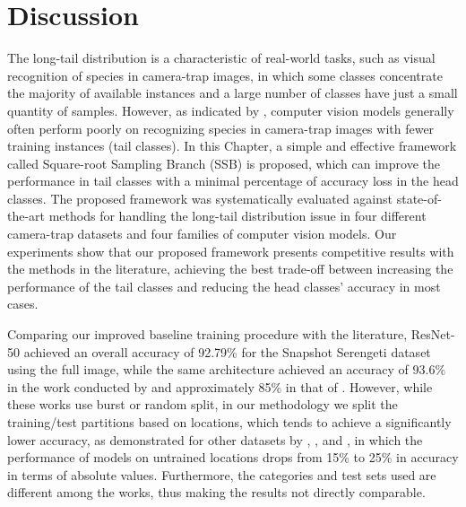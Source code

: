 \section{Discussion}

The long-tail distribution is a characteristic of real-world tasks, such as
visual recognition of species in camera-trap images, in which some classes
concentrate the majority of available instances and a large number of classes
have just a small quantity of samples. However, as indicated by
\citet{schneider2020three}, computer vision models generally often perform
poorly on recognizing species in camera-trap images with fewer training
instances (tail classes). In this Chapter, a simple and effective framework
called Square-root Sampling Branch (SSB) is proposed, which can improve the
performance in tail classes with a minimal percentage of accuracy loss in the
head classes. The proposed framework was systematically evaluated against
state-of-the-art methods for handling the long-tail distribution issue in four
different camera-trap datasets and four families of computer vision models. Our
experiments show that our proposed framework presents competitive results with
the methods in the literature, achieving the best trade-off between increasing
the performance of the tail classes and reducing the head classes’ accuracy in
most cases.

Comparing our improved baseline training procedure with the literature,
ResNet-50 achieved an overall accuracy of 92.79\% for the Snapshot Serengeti
dataset using the full image, while the same architecture achieved an accuracy
of 93.6\% in the work conducted by \citet{norouzzadeh2018automatically} and
approximately 85\% in that of \citet{villa2017towards}. However, while these
works use burst or random split, in our methodology we split the training/test
partitions based on locations, which tends to achieve a significantly lower
accuracy, as demonstrated for other datasets by \citet{beery2018recognition},
\citet{schneider2020three}, and \citet{tabak2019machine}, in which the
performance of models on untrained locations drops from 15\% to 25\% in accuracy
in terms of absolute values. Furthermore, the categories and test sets used are
different among the works, thus making the results not directly comparable. 

